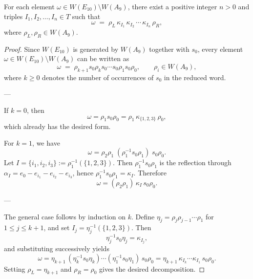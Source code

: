 \documentclass[10pt,a4paper]{amsart}
\begin{document}
\begin{lem}\label{L:kappaDecomposition}
For each element \(\omega \in W(E_{10}) \setminus W(A_9)\), 
there exist a positive integer \(n>0\) and triples 
\(I_1, I_2, \dots, I_n \in T\) such that
\[
\omega \;=\; \rho_L\, \kappa_{I_1}\, \kappa_{I_2}\, \cdots\, \kappa_{I_n}\, \rho_R,
\]
where \(\rho_L, \rho_R \in W(A_9)\).
\end{lem}

\begin{proof}
Since $W(E_{10})$ is generated by $W(A_9)$ together with $s_0$, 
every element $\omega \in W(E_{10}) \setminus W(A_9)$ can be written as
\[
\omega \;=\; \rho_{k+1} s_0 \rho_k s_0 \cdots s_0 \rho_1 s_0 \rho_0,
\qquad \rho_i \in W(A_9),
\]
where $k\ge 0$ denotes the number of occurrences of $s_0$ in the reduced word.

---

If $k=0$, then 
\[
\omega = \rho_1 s_0 \rho_0 = \rho_1\, \kappa_{\{1,2,3\}}\, \rho_0,
\]
which already has the desired form.

For $k=1$, we have
\[
\omega 
= \rho_2 \rho_1 \; (\rho_1^{-1} s_0 \rho_1)\; s_0 \rho_0.
\]
Let $I=\{i_1,i_2,i_3\}:=\rho_1^{-1}(\{1,2,3\})$.
Then $\rho_1^{-1} s_0 \rho_1$ is the reflection through 
\(\alpha_I = e_0 - e_{i_1}-e_{i_2}-e_{i_3}\),
hence $\rho_1^{-1} s_0 \rho_1 = \kappa_I$. 
Therefore
\[
\omega = (\rho_2\rho_1)\, \kappa_I\, s_0 \rho_0.
\]

---

The general case follows by induction on $k$.  
Define $\eta_j = \rho_j \rho_{j-1}\cdots\rho_1$ for $1\le j\le k+1$, 
and set $I_j = \eta_j^{-1}(\{1,2,3\})$. 
Then
\[
\eta_j^{-1} s_0 \eta_j = \kappa_{I_j},
\]
and substituting successively yields
\[
\omega 
= \eta_{k+1}\, (\eta_k^{-1}s_0\eta_k)\cdots(\eta_1^{-1}s_0\eta_1)\, s_0\rho_0
= \eta_{k+1}\, \kappa_{I_k}\cdots\kappa_{I_1}\, s_0\rho_0.
\]
Setting $\rho_L = \eta_{k+1}$ and $\rho_R = \rho_0$ 
gives the desired decomposition.
\end{proof}
\end{document}
